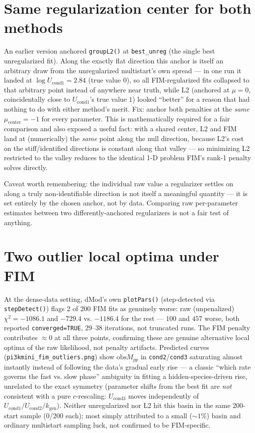 \documentclass[11pt]{article}
\newcommand{\code}[1]{\texttt{#1}}
\newcommand{\file}[1]{\textcolor{black!60}{\texttt{#1}}}
\begin{document}
\section{Same regularization center for both methods}
\label{sec:same-center}

An earlier version anchored \code{groupL2()} at \code{best\_unreg} (the
single best unregularized fit). Along the exactly flat direction this anchor
is itself an arbitrary draw from the unregularized multistart's own spread
--- in one run it landed at $\log U_{\text{cond1}} = 2.84$ (true value $0$),
so all FIM-regularized fits collapsed to that arbitrary point instead of
anywhere near truth, while L2 (anchored at $\mu=0$, coincidentally close to
$U_{\text{cond1}}$'s true value $1$) looked ``better'' for a reason that had
nothing to do with either method's merit. Fix: anchor both penalties at the
\emph{same} $\mu_{\text{center}}=-1$ for every parameter. This is mathematically
required for a fair comparison and also exposed a useful fact: with a shared
center, L2 and FIM land at (numerically) the \emph{same} point along the null
direction, because L2's cost on the stiff/identified directions is constant
along that valley --- so minimizing L2 restricted to the valley reduces to
the identical 1-D problem FIM's rank-1 penalty solves directly.

Caveat worth remembering: the individual raw value a regularizer settles on
along a truly non-identifiable direction is not itself a meaningful quantity
--- it is set entirely by the chosen anchor, not by data. Comparing raw
per-parameter estimates between two differently-anchored regularizers is not
a fair test of anything.

\section{Two outlier local optima under FIM}
\label{sec:outliers}

At the dense-data setting, dMod's own \code{plotPars()} (step-detected via
\code{stepDetect()}) flags 2 of 200 FIM fits as genuinely worse: raw
(unpenalized) $\chi^2 = -1086.1$ and $-729.4$ vs. $-1186.4$ for the rest ---
$100$ and $457$ worse, both reported \code{converged=TRUE}, 29--38
iterations, not truncated runs. The FIM penalty contributes $\approx 0$ at
all three points, confirming these are genuine alternative local optima of
the raw likelihood, not penalty artifacts. Predicted curves
(\file{pi3kmini\_fim\_outliers.png}) show $\mathrm{obs}M_{pp}$ in
\code{cond2}/\code{cond3} saturating almost instantly instead of following
the data's gradual early rise --- a classic ``which rate governs the fast vs.
slow phase'' ambiguity in fitting a hidden-species-driven rise, unrelated to
the exact symmetry (parameter shifts from the best fit are \emph{not}
consistent with a pure $c$-rescaling: $U_{\text{cond3}}$ moves independently
of $U_{\text{cond1}}/U_{\text{cond2}}/k_{\text{gen}}$). Neither unregularized
nor L2 hit this basin in the same 200-start sample (0/200 each); most simply
attributed to a small ($\sim\!1\%$) basin and ordinary multistart sampling
luck, not confirmed to be FIM-specific.
\end{document}
